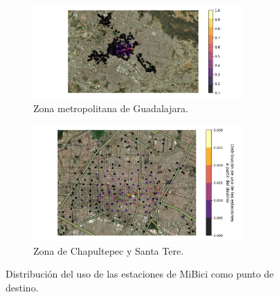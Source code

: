 \begin{figure}[H]
    \centering
    \begin{subfigure}[b]{8cm}
        \includegraphics[width=8cm]{Graphics/repetition_destino.png}
        \caption{Zona metropolitana de Guadalajara.}
        \label{fig:distribution_station_all_destiny}
    \end{subfigure}
    \hspace{0.5cm}
    \begin{subfigure}[b]{8cm}
        \includegraphics[width=8cm]{Graphics/repetition_destino_zoom.png}
        \caption{Zona de Chapultepec y Santa Tere.}
        \label{fig:distribution_station_zoom_destiny}
    \end{subfigure}
    \caption{Distribución del uso de las estaciones de MiBici como punto de destino.}
    \label{fig:distribution_destiny}
\end{figure}

